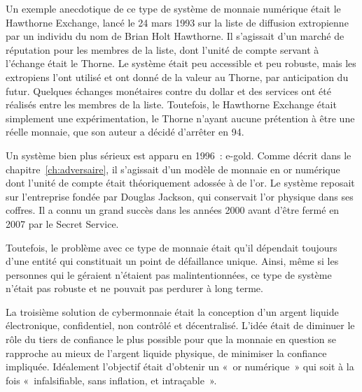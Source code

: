 Un exemple anecdotique de ce type de système de monnaie numérique était le Hawthorne Exchange, lancé le 24 mars 1993 sur la liste de diffusion extropienne par un individu du nom de Brian Holt Hawthorne. Il s'agissait d'un marché de réputation pour les membres de la liste, dont l'unité de compte servant à l'échange était le Thorne. Le système était peu accessible et peu robuste, mais les extropiens l'ont utilisé et ont donné de la valeur au Thorne, par anticipation du futur. Quelques échanges monétaires contre du dollar et des services ont été réalisés entre les membres de la liste. Toutefois, le Hawthorne Exchange était simplement une expérimentation, le Thorne n'ayant aucune prétention à être une réelle monnaie, que son auteur a décidé d'arrêter en 94. %

Un système bien plus sérieux est apparu en 1996~: e-gold. Comme décrit dans le chapitre~\ref{ch:adversaire}, il s'agissait d'un modèle de monnaie en or numérique dont l'unité de compte était théoriquement adossée à de l'or. Le système reposait sur l'entreprise  fondée par Douglas Jackson, qui conservait l'or physique dans ses coffres. Il a connu un grand succès dans les années 2000 avant d'être fermé en 2007 par le Secret Service.

Toutefois, le problème avec ce type de monnaie était qu'il dépendait toujours d'une entité qui constituait un point de défaillance unique. Ainsi, même si les personnes qui le géraient n'étaient pas malintentionnées, ce type de système n'était pas robuste et ne pouvait pas perdurer à long terme.


La troisième solution de cybermonnaie était la conception d'un argent liquide électronique, confidentiel, non contrôlé et décentralisé. L'idée était de diminuer le rôle du tiers de confiance le plus possible pour que la monnaie en question se rapproche au mieux de l'argent liquide physique, de minimiser la confiance impliquée. Idéalement l'objectif était d'obtenir un «~or numérique~» qui soit à la fois «~infalsifiable, sans inflation, et intraçable~». %


